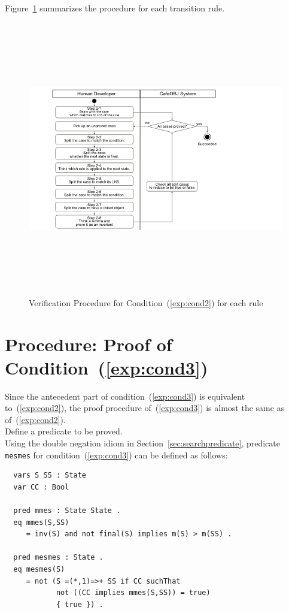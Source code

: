 \documentclass[12pt]{report}
\begin{document}
Figure~\ref{fig:procedure2} summarizes the procedure for each transition rule.
\begin{figure}
\centering
\includegraphics[height=12cm,natwidth=720,natheight=405,clip,trim=60 0 180 0]{procedure2.png}
\caption{Verification Procedure for Condition~(\ref{exp:cond2}) for each rule}
\label{fig:procedure2}
\end{figure}

\section{Procedure: Proof of Condition~(\ref{exp:cond3})}
\label{sec:mesmes}
Since the antecedent part of condition~(\ref{exp:cond3}) is equivalent
to~(\ref{exp:cond2}), the proof procedure of~(\ref{exp:cond3}) is
almost the same as of~(\ref{exp:cond2}). \\

 Define a predicate to be proved.\\
Using the double negation idiom in Section~\ref{sec:searchpredicate},
predicate {\tt mesmes} for condition~(\ref{exp:cond3}) can be defined
as follows:
\small
\begin{verbatim}
  vars S SS : State
  var CC : Bool

  pred mmes : State State .
  eq mmes(S,SS)
     = inv(S) and not final(S) implies m(S) > m(SS) .

  pred mesmes : State .
  eq mesmes(S)
     = not (S =(*,1)=>+ SS if CC suchThat
            not ((CC implies mmes(S,SS)) = true)
            { true }) .
\end{verbatim}
\normalsize
\end{document}
